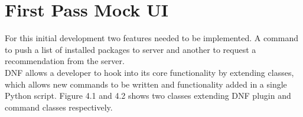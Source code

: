 \documentclass{l4proj}
\begin{document}
\section{First Pass Mock UI}
For this initial development two features needed to be implemented. A command to push a list of installed packages to server and another to request a recommendation from the server.\\
DNF allows a developer to hook into its core functionality by extending classes, which allows new commands to be written and functionality added in a single Python script. Figure 4.1 and 4.2 shows two classes extending DNF plugin and command classes respectively.
\begin{figure}

\end{figure}
\begin{figure}

\end{figure}
\end{document}
